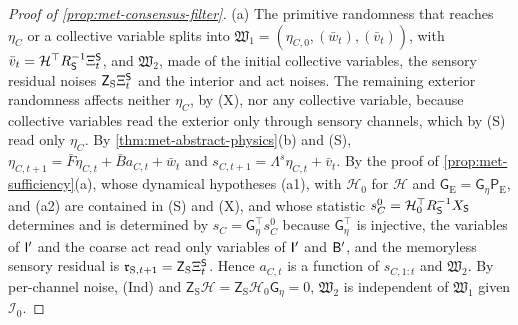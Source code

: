 \begin{proof}[Proof of \cref{prop:met-consensus-filter}]
(a) The primitive randomness that reaches $\eta_C$ or a collective variable splits into $\mathfrak W_1=(\eta_{C,0},(\bar w_t),(\bar v_t))$, with $\bar v_t=\mathcal H^\top R_{\mathsf{S}}^{-1}\Xi^{\mathsf{S}}_t$, and $\mathfrak W_2$, made of the initial collective variables, the sensory residual noises $\mathsf Z_{\mathrm S}\Xi^{\mathsf{S}}_t$ and the interior and act noises. The remaining exterior randomness affects neither $\eta_C$, by (X), nor any collective variable, because collective variables read the exterior only through sensory channels, which by (S) read only $\eta_C$. By \cref{thm:met-abstract-physics}(b) and (S), $\eta_{C,t+1}=\bar F\eta_{C,t}+\bar Ba_{C,t}+\bar w_t$ and $s_{C,t+1}=\Lambda^s\eta_{C,t}+\bar v_t$. By the proof of \cref{prop:met-sufficiency}(a), whose dynamical hypotheses (a1), with $\mathcal H_0$ for $\mathcal H$ and $\mathsf G_{\mathrm E}=\mathsf G_\eta\mathsf P_{\mathrm E}$, and (a2) are contained in (S) and (X), and whose statistic $s^0_C=\mathcal H_0^\top R_{\mathsf{S}}^{-1}X_{\mathsf{S}}$ determines and is determined by $s_C=\mathsf G_\eta^\top s^0_C$ because $\mathsf G_\eta^\top$ is injective, the variables of $\mathsf{I}'$ and the coarse act read only variables of $\mathsf{I}'$ and $\mathsf{B}'$, and the memoryless sensory residual is $\mathfrak r_{\mathrm S,t+1}=\mathsf Z_{\mathrm S}\Xi^{\mathsf{S}}_t$. Hence $a_{C,t}$ is a function of $s_{C,1:t}$ and $\mathfrak W_2$. By per-channel noise, (Ind) and $\mathsf Z_{\mathrm S}\mathcal H=\mathsf Z_{\mathrm S}\mathcal H_0\mathsf G_\eta=0$, $\mathfrak W_2$ is independent of $\mathfrak W_1$ given $\mathcal I_0$.


\end{proof}

